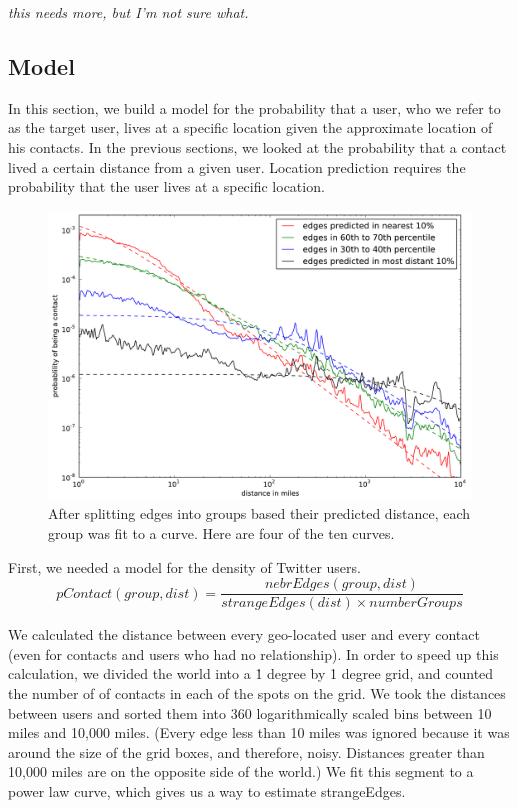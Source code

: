 \emph{this needs more, but I'm not sure what.}


\subsection{Model}
\label{sec:model}

In this section, we build a model for the probability that a user, who we refer
to as the target user, lives at a specific location given the approximate
location of his contacts.
%
In the previous sections, we looked at the probability that a contact lived a
certain distance from a given user.
%
Location prediction requires the probability that the user lives at a specific
location.


\begin{figure}[tb]
\centering
\includegraphics[width=\linewidth]{figures/near_prob_fit.pdf}
\caption{
After splitting edges into groups based their predicted distance, each group was fit to a curve. Here are four of the ten curves.
}
\label{fig:NearProbFit}
\end{figure}

First, we needed a model for the density of Twitter users.
\[
    pContact(group,dist) = \frac{nebrEdges(group,dist)}{strangeEdges(dist) \times numberGroups}
\]

We calculated the distance between every geo-located user and every contact
(even for contacts and users who had no relationship).
%
In order to speed up this calculation, we divided the world into a \.1 degree
by \.1 degree grid, and counted the number of of contacts in each of the spots
on the grid.
%
We took the distances between users and sorted them into 360 logarithmically
scaled bins between 10 miles and 10,000 miles.
%
(Every edge less than 10 miles was ignored because it was around the size of
the grid boxes, and therefore, noisy. Distances greater than 10,000 miles are
on the opposite side of the world.)
%
We fit this segment to a power law curve, which gives us a way to estimate
strangeEdges.


